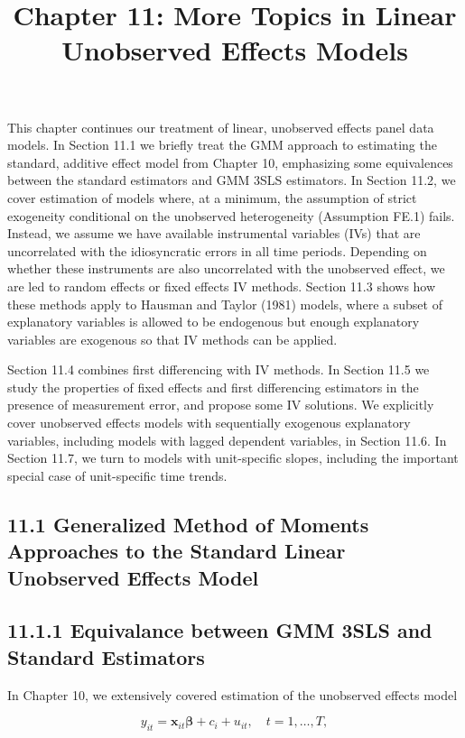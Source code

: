 \documentclass[10pt]{article}
\title{Chapter 11: More Topics in Linear Unobserved Effects Models}
\author{}
\date{}
\begin{document}
\maketitle

This chapter continues our treatment of linear, unobserved effects panel data models. In Section 11.1 we briefly treat the GMM approach to estimating the standard, additive effect model from Chapter 10, emphasizing some equivalences between the standard estimators and GMM 3SLS estimators. In Section 11.2, we cover estimation of models where, at a minimum, the assumption of strict exogeneity conditional on the unobserved heterogeneity (Assumption FE.1) fails. Instead, we assume we have available instrumental variables (IVs) that are uncorrelated with the idiosyncratic errors in all time periods. Depending on whether these instruments are also uncorrelated with the unobserved effect, we are led to random effects or fixed effects IV methods. Section 11.3 shows how these methods apply to Hausman and Taylor (1981) models, where a subset of explanatory variables is allowed to be endogenous but enough explanatory variables are exogenous so that IV methods can be applied.

Section 11.4 combines first differencing with IV methods. In Section 11.5 we study the properties of fixed effects and first differencing estimators in the presence of measurement error, and propose some IV solutions. We explicitly cover unobserved effects models with sequentially exogenous explanatory variables, including models with lagged dependent variables, in Section 11.6. In Section 11.7, we turn to models with unit-specific slopes, including the important special case of unit-specific time trends.

\subsection*{11.1 Generalized Method of Moments Approaches to the Standard Linear Unobserved Effects Model}
\subsection*{11.1.1 Equivalance between GMM 3SLS and Standard Estimators}
In Chapter 10, we extensively covered estimation of the unobserved effects model


\begin{equation*}
y_{i t}=\mathbf{x}_{i t} \boldsymbol{\beta}+c_{i}+u_{i t}, \quad t=1, \ldots, T, \tag{11.1}
\end{equation*}
\end{document}
